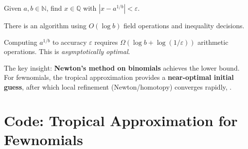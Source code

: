 \begin{problem}
Given $a,b \in \mathbb{N}$, find $x \in \mathbb{Q}$ with $|x - a^{1/b}| < \varepsilon$.
\end{problem}

\begin{lemma}
There is an algorithm using $O(\log b)$ field operations and inequality decisions.
\end{lemma}

\begin{theorem}
Computing $a^{1/b}$ to accuracy $\varepsilon$ requires $\Omega(\log b + \log(1/\varepsilon))$ arithmetic operations. This is \emph{asymptotically optimal}.
\end{theorem}

The key insight: \textbf{Newton's method on binomials} achieves the lower bound. For fewnomials, the tropical approximation provides a \textbf{near-optimal initial guess}, after which local refinement (Newton/homotopy) converges rapidly, \cite{rojas2025fewnomial}.

\section{Code: Tropical Approximation for Fewnomials}
\label{sec:few:code}

